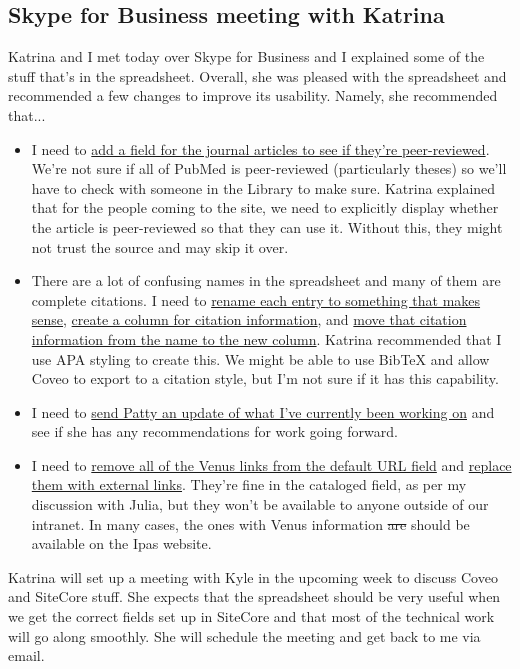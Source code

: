 \documentclass{article}
\begin{document}
\subsection{Skype for Business meeting with Katrina}
Katrina and I met today over Skype for Business and I explained some of the stuff that's in the spreadsheet. Overall, she was pleased with the spreadsheet and recommended a few changes to improve its usability. Namely, she recommended that...
    \begin{itemize}
    \itemsep0em 
        \item I need to \ul{add a field for the journal articles to see if they're peer-reviewed}. We're not sure if all of PubMed is peer-reviewed (particularly theses) so we'll have to check with someone in the Library to make sure. Katrina explained that for the people coming to the site, we need to explicitly display whether the article is peer-reviewed so that they can use it. Without this, they might not trust the source and may skip it over.
        \item There are a lot of confusing names in the spreadsheet and many of them are complete citations. I need to \ul{rename each entry to something that makes sense}, \ul{create a column for citation information}, and \ul{move that citation information from the name to the new column}. Katrina recommended that I use APA styling to create this. We might be able to use BibTeX and allow Coveo to export to a citation style, but I'm not sure if it has this capability.
        \item I need to \ul{send Patty an update of what I've currently been working on} and see if she has any recommendations for work going forward.
        \item I need to \ul{remove all of the Venus links from the default URL field} and \ul{replace them with external links}. They're fine in the cataloged field, as per my discussion with Julia, but they won't be available to anyone outside of our intranet. In many cases, the ones with Venus information \st{are} should be available on the Ipas website.
\end{itemize}
Katrina will set up a meeting with Kyle in the upcoming week to discuss Coveo and SiteCore stuff. She expects that the spreadsheet should be very useful when we get the correct fields set up in SiteCore and that most of the technical work will go along smoothly. She will schedule the meeting and get back to me via email.
\end{document}
